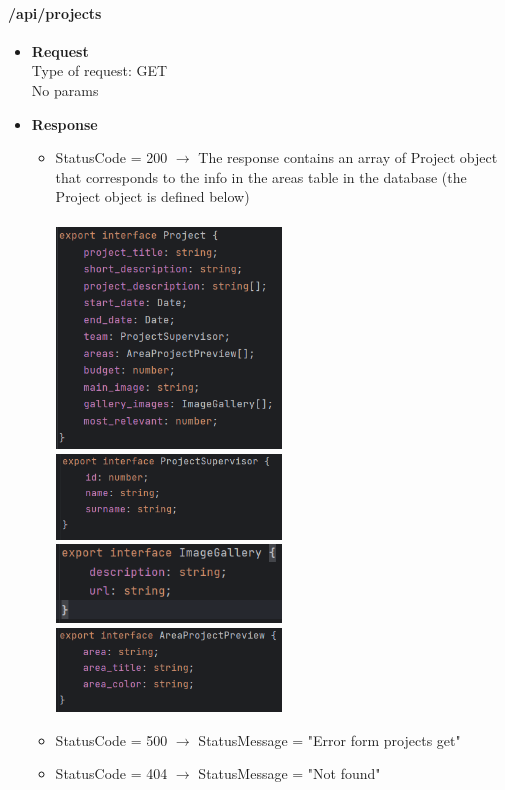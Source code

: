 \documentclass[11pt, letterpaper]{article}
\begin{document}
\paragraph{/api/projects}
\begin{itemize}
    \item \textbf{Request} \\ Type of request: GET \\ No params 
    \item \textbf{Response} \begin{itemize}
        \item StatusCode = 200 $\rightarrow$ The response contains an array of Project object that corresponds to the info in the areas table in the database (the Project object is defined below)\\ \\
            \includegraphics[width=6cm]{images/API/Project.png} \includegraphics[width=6cm]{images/API/ProjectSuperv.png}  \\ \includegraphics[width=6cm]{images/API/ImageGallery.png} \includegraphics[width=6cm]{images/API/AreaPreview.png}
        \item StatusCode = 500 $\rightarrow$ StatusMessage = "Error form projects get"
        \item StatusCode = 404 $\rightarrow$ StatusMessage = "Not found"
    \end{itemize} 
\end{itemize}
\end{document}
